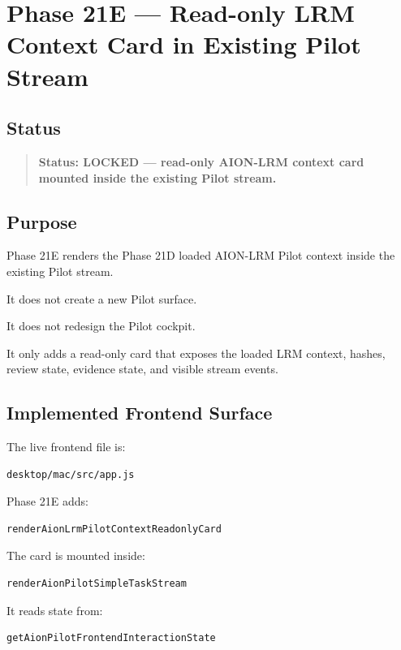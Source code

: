 \section{Phase 21E --- Read-only LRM Context Card in Existing Pilot Stream}
\label{sec:phase21e-lrm-pilot-readonly-context-card-lock}

\subsection{Status}

\begin{quote}
\textbf{Status: LOCKED --- read-only AION-LRM context card mounted inside the existing Pilot stream.}
\end{quote}

\subsection{Purpose}

Phase 21E renders the Phase 21D loaded AION-LRM Pilot context inside the existing Pilot stream.

It does not create a new Pilot surface.

It does not redesign the Pilot cockpit.

It only adds a read-only card that exposes the loaded LRM context, hashes, review state, evidence state, and visible stream events.

\subsection{Implemented Frontend Surface}

The live frontend file is:

\begin{verbatim}
desktop/mac/src/app.js
\end{verbatim}

Phase 21E adds:

\begin{verbatim}
renderAionLrmPilotContextReadonlyCard
\end{verbatim}

The card is mounted inside:

\begin{verbatim}
renderAionPilotSimpleTaskStream
\end{verbatim}

It reads state from:

\begin{verbatim}
getAionPilotFrontendInteractionState
\end{verbatim}

